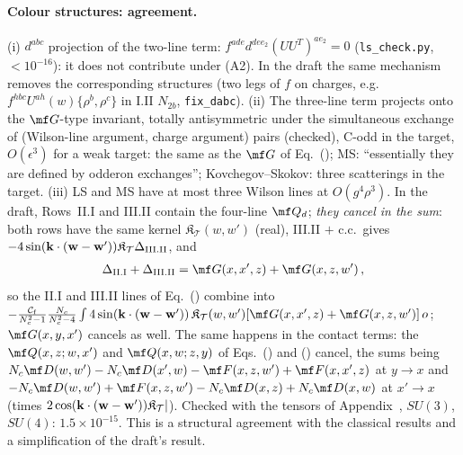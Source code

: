 \paragraph{Colour structures: agreement.} (i) $d^{abc}$ projection of the two-line term: $f^{ade}d^{dee_2}(UU^T)^{ae_2}=0$ (\texttt{ls\_check.py}, $<10^{-16}$): it does not contribute under (A2). In the draft the same mechanism removes the corresponding structures (two legs of $f$ on charges, e.g.\ $f^{hbc}U^{ah}(w)\{\rho^b,\rho^c\}$ in I.II $N_{2b}$, \texttt{fix\_dabc}). (ii) The three-line term projects onto the $\mf G$-type invariant, totally antisymmetric under the simultaneous exchange of (Wilson-line argument, charge argument) pairs (checked), C-odd in the target, $O(\epsilon^3)$ for a weak target: the same as the $\mf G$ of Eq.~(); MS: ``essentially they are defined by odderon exchanges''; Kovchegov--Skokov: three scatterings in the target. (iii) LS and MS have at most three Wilson lines at $O(g^4\rho^3)$. In the draft, Rows~II.I and III.II contain the four-line $\mf Q_d$; \emph{they cancel in the sum}: both rows have the same kernel $\mathfrak K_{\mathcal T}(w,w')$ (real), III.II $+$ c.c.\ gives $-4\sin(\mathbf{k}\cdot(\mathbf{w}-\mathbf{w}'))\mathfrak K_{\mathcal T}\Delta_{\rm III.II}$, and
\begin{align}\label{r3c:Qdcancel}
\Delta_{\rm II.I}+\Delta_{\rm III.II}=\mf G(x,x',z)+\mf G(x,z,w')\,,
\end{align}
so the II.I and III.II lines of Eq.~() combine into $-\frac{\mathcal C_{\rm f}}{N_c^2-1}\frac{N_c}{N_c^2-4}\int4\sin(\v k\cdot(\v w-\v w'))\,\mathfrak K_{\mathcal T}(w,w')[\mf G(x,x',z)+\mf G(x,z,w')]\,o$; $\mf G(x,y,x')$ cancels as well. The same happens in the contact terms: the $\mf Q(x,z;w,x')$ and $\mf Q(x,w;z,y)$ of Eqs.~() and () cancel, the sums being $N_c\mf D(w,w')-N_c\mf D(x',w)-\mf F(x,z,w')+\mf F(x,x',z)$ at $y\to x$ and $-N_c\mf D(w,w')+\mf F(x,z,w')-N_c\mf D(x,z)+N_c\mf D(x,w)$ at $x'\to x$ (times $2\cos(\mathbf{k}\cdot(\mathbf{w}-\mathbf{w}'))\mathfrak K_{\mathcal T}|$). Checked with the tensors of Appendix~, $SU(3)$, $SU(4)$: $1.5\times10^{-15}$. This is a structural agreement with the classical results and a simplification of the draft's result.
